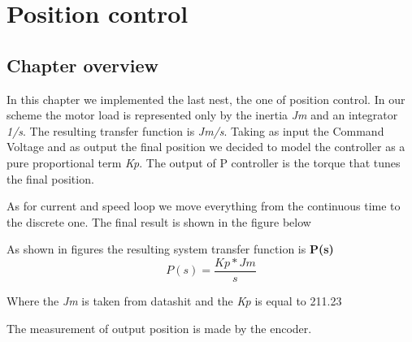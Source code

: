 \documentclass[12pt]{article}
\begin{document}
\section{Position control}
\subsection{Chapter overview}
In this chapter we implemented the last nest, the one of position control.
In our scheme the motor load is represented only by the inertia \textit{Jm} and an integrator \textit{1/s}. The resulting transfer function is \textit{Jm/s}.
Taking as input the Command Voltage and as output the final position we decided to model the controller as a pure proportional term \textit{Kp}.
The output of P controller is the torque that tunes the final position. 


As for current and speed loop we move everything from the continuous time to the discrete one. The final result is shown in the figure below


As shown in figures the resulting system transfer function is \textbf{P(s)}
\begin{equation}
P(s) = \dfrac{Kp*Jm}{s}
\end{equation}

Where the \textit{Jm} is taken from datashit and the \textit{Kp} is equal to 211.23

The measurement of output position is made by the encoder.
\end{document}
